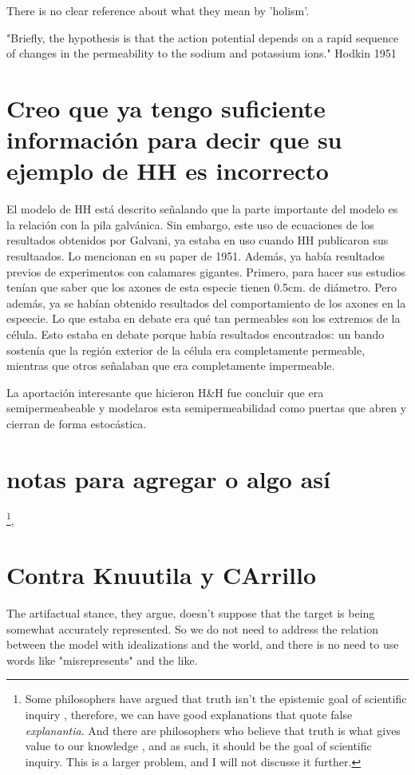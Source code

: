 There is no clear reference about what they mean by 'holism'.

"Briefly,  the hypothesis is that the action potential depends on a rapid sequence of changes  in the permeability to the sodium and potassium ions." Hodkin 1951 


\section{Creo que ya tengo suficiente información para decir que su ejemplo de HH es incorrecto}

El modelo de HH está descrito señalando que la parte importante del modelo es la relación con la pila galvánica.
Sin embargo, este uso de ecuaciones de los resultados obtenidos por Galvani, ya estaba en uso cuando HH publicaron sus resultaados.
Lo mencionan en su paper de 1951.
Además, ya había resultados previos de experimentos con calamares gigantes.
Primero, para hacer sus estudios tenían que saber que los axones de esta especie tienen 0.5cm. de diámetro.
Pero además, ya se habían obtenido resultados del comportamiento de los axones en la espeecie.
Lo que estaba en debate era qué tan permeables son los extremos de la célula.
Esto estaba en debate porque había resultados encontrados: un bando sostenía que la región exterior de la célula era completamente permeable, mientras que otros señalaban que era completamente impermeable.


La aportación interesante que hicieron H\&H fue concluir que era semipermeabeable y modelaros esta semipermeabilidad como puertas que abren y cierran de forma estocástica.



\section{notas para agregar o algo así}

\footnote
{Some philosophers have argued that truth isn't the epistemic goal of scientific inquiry \cite{elgin2017true, Potochnik2017-POTIAT-3}, therefore, we can have good explanations that quote false \emph{explanantia}.
	And there are philosophers who believe that truth is what gives value to our knowledge \cite{pritchard2021, pritchard2021a}, and as such, it should be the goal of scientific inquiry.
	This is a larger problem, and I will not discusse it further.
},


\section{Contra Knuutila y CArrillo}
The artifactual stance, they argue, doesn't suppose that the target is being somewhat accurately represented.
So we do not need to address the relation between the model with idealizations and the world, and there is no need to use words like "misrepresents" and the like.

